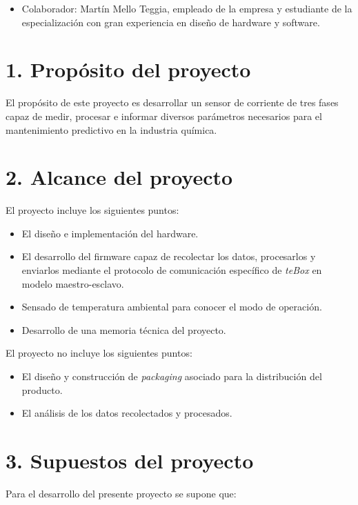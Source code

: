 \documentclass[11pt]{charter}
\begin{document}
\begin{itemize}
\item Colaborador: Martín Mello Teggia, empleado de la empresa \empclientename  y estudiante de la especialización con gran experiencia en diseño de hardware y software.
\end{itemize}




\section{1. Propósito del proyecto}
\label{sec:proposito}

El propósito de este proyecto es desarrollar un sensor de corriente de tres fases capaz de medir, procesar e informar diversos parámetros necesarios para el mantenimiento predictivo en la industria química.

\section{2. Alcance del proyecto}
\label{sec:alcance}

El proyecto incluye los siguientes puntos:
\begin{itemize}
\item El diseño e implementación del hardware.
\item El desarrollo del firmware capaz de recolectar los datos, procesarlos y enviarlos mediante el protocolo de comunicación específico de \textit{teBox} en modelo maestro-esclavo.
\item Sensado de temperatura ambiental para conocer el modo de operación.
\item Desarrollo de una memoria técnica del proyecto.
\end{itemize}

El proyecto no incluye los siguientes puntos:
\begin{itemize}
\item El diseño y construcción de \textit{packaging} asociado para la distribución del producto.
\item El análisis de los datos recolectados y procesados.
\end{itemize}

\section{3. Supuestos del proyecto}
\label{sec:supuestos}

Para el desarrollo del presente proyecto se supone que:
\end{document}
